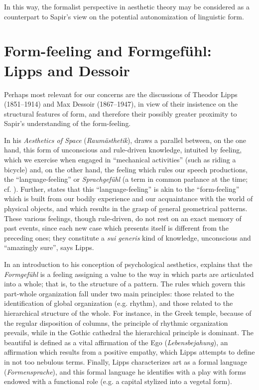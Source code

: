 \documentclass[output=paper]{langscibook}
\begin{document}
In this way, the formalist perspective in aesthetic theory may be considered as a counterpart to Sapir's view on the potential autonomization of linguistic form.

\section{Form-feeling and Formgefühl: Lipps and Dessoir}
\label{sec:fortis:lippsdessoir}

Perhaps most relevant for our concerns are the discussions of Theodor Lipps (1851--1914) and Max Dessoir (1867--1947), in view of their insistence on the structural features of form, and therefore their possibly greater proximity to Sapir's understanding of the form-feeling.

In his \emph{Aesthetics of Space} (\emph{Raumästhetik}), \citet{Lipps1897} draws a parallel between, on the one hand, this form of unconscious and rule-driven knowledge, intuited by feeling, which we exercise when engaged in ``mechanical activities'' (such as riding a bicycle) and, on the other hand, the feeling which rules our speech productions, the ``language-feeling'' or \emph{Sprachgefühl} (a term in common parlance at the time; cf. \citealt{Tchougounnikov}). Further, \citet[ch. 8]{Lipps1897} states that this ``language-feeling'' is akin to the ``form-feeling'' which is built from our bodily experience and our acquaintance with the world of physical objects, and which results in the grasp of general geometrical patterns. These various feelings, though rule-driven, do not rest on an exact memory of past events, since each new case which presents itself is different from the preceding ones; they constitute a \emph{sui generis} kind of knowledge, unconscious and ``amazingly sure'', says Lipps.

In an introduction to his conception of psychological aesthetics, \citet{Lipps1907} explains that the \emph{Formgefühl} is a feeling assigning a value to the way in which parts are articulated into a whole; that is, to the structure of a pattern. The rules which govern this part-whole organization fall under two main principles: those related to the identification of global organization (e.g. rhythm), and those related to the hierarchical structure of the whole. For instance, in the Greek temple, because of the regular disposition of columns, the principle of rhythmic organization prevails, while in the Gothic cathedral the hierarchical principle is dominant. The beautiful is defined as a vital affirmation of the Ego (\emph{Lebensbejahung}), an affirmation which results from a positive empathy, which Lipps attempts to define in not too nebulous terms. Finally, Lipps characterizes art as a formal language (\emph{Formensprache}), and this formal language he identifies with a play with forms endowed with a functional role (e.g. a capital stylized into a vegetal form).
\end{document}

